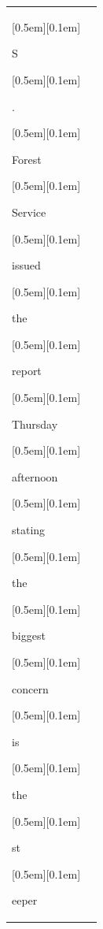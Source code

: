\begin{table}[ht]
\begin{tabular}{@{}l p{13cm}@{}}
{\setlength{\fboxsep}{1pt}\raisebox{0pt}[0.5em][0.1em]{\colorbox{DarkOrchid!25}{\strut{S}}}}{\setlength{\fboxsep}{1pt}\raisebox{0pt}[0.5em][0.1em]{\colorbox{SkyBlue!55}{\strut{.}}}}{\setlength{\fboxsep}{1pt}\raisebox{0pt}[0.5em][0.1em]{\colorbox{SkyBlue!55}{\strut{ Forest}}}}{\setlength{\fboxsep}{1pt}\raisebox{0pt}[0.5em][0.1em]{\colorbox{Salmon!60}{\strut{ Service}}}}{\setlength{\fboxsep}{1pt}\raisebox{0pt}[0.5em][0.1em]{\colorbox{SkyBlue!55}{\strut{ issued}}}}{\setlength{\fboxsep}{1pt}\raisebox{0pt}[0.5em][0.1em]{\colorbox{SkyBlue!55}{\strut{ the}}}}{\setlength{\fboxsep}{1pt}\raisebox{0pt}[0.5em][0.1em]{\colorbox{Salmon!60}{\strut{ report}}}}{\setlength{\fboxsep}{1pt}\raisebox{0pt}[0.5em][0.1em]{\colorbox{DarkOrchid!25}{\strut{ Thursday}}}}{\setlength{\fboxsep}{1pt}\raisebox{0pt}[0.5em][0.1em]{\colorbox{DarkOrchid!25}{\strut{ afternoon}}}}{\setlength{\fboxsep}{1pt}\raisebox{0pt}[0.5em][0.1em]{\colorbox{SkyBlue!55}{\strut{ stating}}}}{\setlength{\fboxsep}{1pt}\raisebox{0pt}[0.5em][0.1em]{\colorbox{SkyBlue!55}{\strut{ the}}}}{\setlength{\fboxsep}{1pt}\raisebox{0pt}[0.5em][0.1em]{\colorbox{Salmon!60}{\strut{ biggest}}}}{\setlength{\fboxsep}{1pt}\raisebox{0pt}[0.5em][0.1em]{\colorbox{DarkOrchid!25}{\strut{ concern}}}}{\setlength{\fboxsep}{1pt}\raisebox{0pt}[0.5em][0.1em]{\colorbox{SkyBlue!55}{\strut{ is}}}}{\setlength{\fboxsep}{1pt}\raisebox{0pt}[0.5em][0.1em]{\colorbox{SkyBlue!55}{\strut{ the}}}}{\setlength{\fboxsep}{1pt}\raisebox{0pt}[0.5em][0.1em]{\colorbox{DarkOrchid!25}{\strut{ st}}}}{\setlength{\fboxsep}{1pt}\raisebox{0pt}[0.5em][0.1em]{\colorbox{Salmon!60}{\strut{eeper}}}}


\end{tabular}
\end{table}
